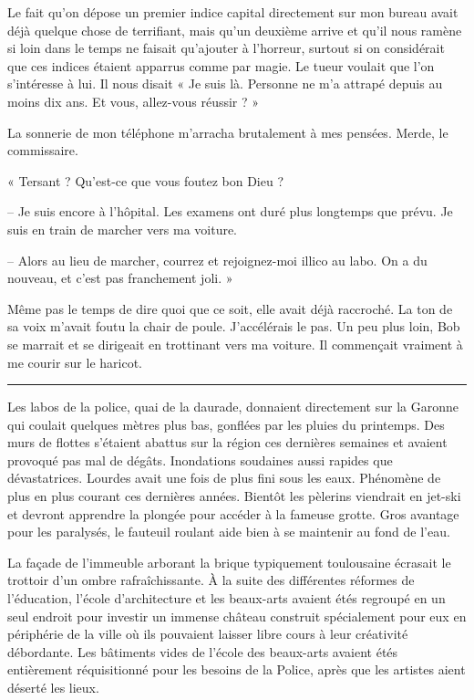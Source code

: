 Le fait qu'on dépose un premier indice capital directement sur mon bureau avait déjà quelque chose de terrifiant, mais 
qu'un deuxième arrive et qu'il nous ramène si loin dans le temps ne faisait qu'ajouter à l'horreur, surtout si on 
considérait que ces indices étaient apparrus comme par magie. Le tueur voulait que l'on s'intéresse à lui. Il nous 
disait « Je suis là. Personne ne m'a attrapé depuis au moins dix ans. Et vous, allez-vous réussir ? »

La sonnerie de mon téléphone m'arracha brutalement à mes pensées. Merde, le commissaire.

« Tersant ? Qu'est-ce que vous foutez bon Dieu ?

-- Je suis encore à l'hôpital. Les examens ont duré plus longtemps que prévu. Je suis en train de marcher vers ma 
voiture.

-- Alors au lieu de marcher, courrez et rejoignez-moi illico au labo. On a du nouveau, et c'est pas franchement joli. »

Même pas le temps de dire quoi que ce soit, elle avait déjà raccroché. La ton de sa voix m'avait foutu la chair de 
poule. J'accélérais le pas. Un peu plus loin, Bob se marrait et se dirigeait en trottinant vers ma voiture. Il 
commençait vraiment à me courir sur le haricot.

\fancybreak{$* * *$}

Les labos de la police, quai de la daurade, donnaient directement sur la Garonne qui coulait quelques mètres plus bas, 
gonflées par les pluies du printemps. Des murs de flottes s'étaient abattus sur la région ces dernières semaines et 
avaient provoqué pas mal de dégâts. Inondations soudaines aussi rapides que dévastatrices. Lourdes avait une fois de 
plus fini sous les eaux. Phénomène de plus en plus courant ces dernières années. Bientôt les pèlerins viendrait en 
jet-ski et devront apprendre la plongée pour accéder à la fameuse grotte. Gros avantage pour les paralysés, le fauteuil 
roulant aide bien à se maintenir au fond de l'eau.

La façade de l'immeuble arborant la brique typiquement toulousaine écrasait le trottoir d'un ombre rafraîchissante. À 
la suite des différentes réformes de l'éducation, l'école d'architecture et les beaux-arts avaient étés regroupé en un 
seul endroit pour investir un immense château construit spécialement pour eux en périphérie de la ville où ils pouvaient 
laisser libre cours à leur créativité débordante. Les bâtiments vides de l'école des beaux-arts avaient étés entièrement 
réquisitionné pour les besoins de la Police, après que les artistes aient déserté les lieux.

